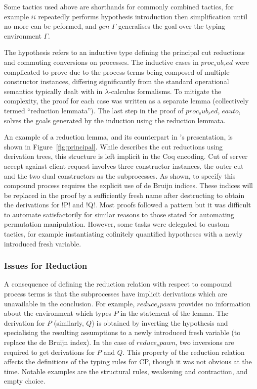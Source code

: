 Some tactics used above are shorthands for commonly combined tactics, for
example \coqe$ii$ repeatedly performs hypothesis introduction then
simplification until no more can be peformed, and \coqe$gen$ $\Gamma$
generalises the goal over the typing environment $\Gamma$.



The  hypothesis refers to an inductive type defining the principal
cut reductions and commuting conversions on processes. The inductive cases in
\coqe$proc_sub_red$ were complicated to prove due to the process terms being
composed of multiple constructor instances, differing significantly from the
standard operational semantics typically dealt with in $\lambda$-calculus
formalisms. To mitigate the complexity, the proof for each case was written as
a separate lemma (collectively termed ``reduction lemmata''). The last step in
the proof of \coqe$proc_sub_red$, \coqe$eauto$, solves the goals generated by
the induction using the reduction lemmata.

An example of a reduction lemma, and its counterpart in
\citeauthor{Wadler:2014}'s presentation, is shown in
Figure~\ref{fig:principal}. While \citeauthor{Wadler:2014} describes the cut
reductions using derivation trees, this structure is left implicit in the Coq
encoding. Cut of server accept against client request involves three
constructor instances, the outer cut and the two dual constructors as the
subprocesses. As shown, to specify this compound process requires the explicit
use of de Bruijn indices. These indices will be replaced in the proof by a
sufficiently fresh name after destructing  to obtain the derivations
for \coqe!P! and \coqe!Q!. Most proofs followed a pattern but it was difficult
to automate satisfactorily for similar reasons to those stated for automating
permutation manipulation. However, some tasks were delegated to custom
tactics, for example instantiating cofinitely quantified hypotheses with a
newly introduced fresh variable.

\subsubsection{Issues for Reduction}

A consequence of defining the reduction relation with respect to compound
process terms is that the subprocesses have implicit derivations which are
unavailable in the conclusion. For example, \coqe$reduce_spawn$ provides no
information about the environment which types \coqe$P$ in the statement of the
lemma. The derivation for \coqe$P$ (similarly, \coqe$Q$) is obtained by
inverting the hypothesis  and specialising the resulting assumptions
to a newly introduced fresh variable (to replace the de Bruijn index). In the
case of \coqe$reduce_spawn$, two inversions are required to get derivations
for \coqe$P$ and \coqe$Q$. This property of the reduction relation affects the
definitions of the typing rules for CP, though it was not obvious at the time.
Notable examples are the structural rules, weakening and contraction, and
empty choice.

